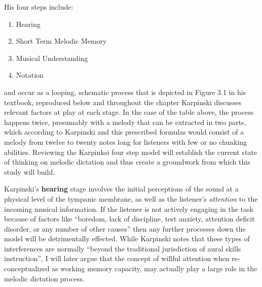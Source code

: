 \documentclass[]{book}
\providecommand{\tightlist}{%
  \setlength{\itemsep}{0pt}\setlength{\parskip}{0pt}}
\theoremstyle{definition}
\theoremstyle{definition}
\theoremstyle{definition}
\theoremstyle{remark}
\begin{document}
His four steps include:

\begin{enumerate}
\def\labelenumi{\arabic{enumi}.}
\tightlist
\item
  Hearing
\item
  Short Term Melodic Memory
\item
  Musical Understanding
\item
  Notation
\end{enumerate}

and occur as a looping, schematic process that is depicted in Figure 3.1
in his textbook, reproduced below and throughout the chapter Karpinski
discusses relevant factors at play at each stage. In the case of the
table above, the process happens twice, presumably with a melody that
can be extracted in two parts, which according to Karpinski and this
prescribed formulas would consist of a melody from twelve to twenty
notes long for listeners with few or no chunking abilities. Reviewing
the Karpinksi four step model will establish the current state of
thinking on melodic dictation and thus create a groundwork from which
this study will build.

Karpinski's \textbf{hearing} stage involves the initial perceptions of
the sound at a physical level of the tympanic membrane, as well as the
listener's \emph{attention} to the incoming musical information. If the
listener is not actively engaging in the task because of factors like
``boredom, lack of discipline, test anxiety, attention deficit disorder,
or any number of other causes'' then any further processes down the
model will be detrimentally effected. While Karpinski notes that these
types of interferences are normally ``beyond the traditional
jurisdiction of aural skills instruction'', I will later argue that the
concept of willful attention when re-conceptualized as working memory
capacity, may actually play a large role in the melodic dictation
process.
\end{document}
